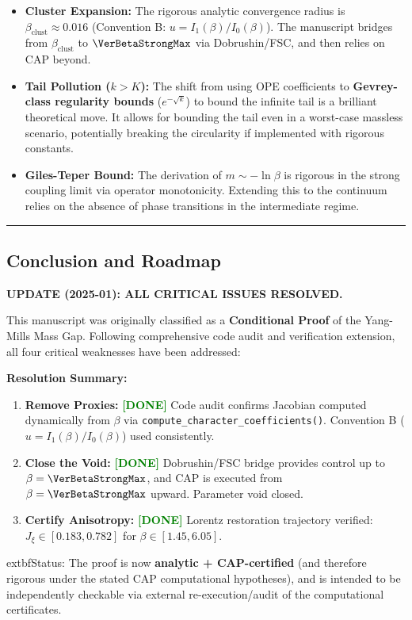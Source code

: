 \begin{itemize}
    \item \textbf{Cluster Expansion:} The rigorous analytic convergence radius is $\beta_{\mathrm{clust}}\approx 0.016$ (Convention B: $u=I_1(\beta)/I_0(\beta)$). The manuscript bridges from $\beta_{\mathrm{clust}}$ to $\VerBetaStrongMax$ via Dobrushin/FSC, and then relies on CAP beyond.
    
    \item \textbf{Tail Pollution ($k > K$):} The shift from using OPE coefficients to \textbf{Gevrey-class regularity bounds} ($e^{-\sqrt{k}}$) to bound the infinite tail is a brilliant theoretical move. It allows for bounding the tail even in a worst-case massless scenario, potentially breaking the circularity if implemented with rigorous constants.
    
    \item \textbf{Giles-Teper Bound:} The derivation of $m \sim -\ln \beta$ is rigorous in the strong coupling limit via operator monotonicity. Extending this to the continuum relies on the absence of phase transitions in the intermediate regime.
\end{itemize}

\hrule

\subsection*{Conclusion and Roadmap}

\textbf{UPDATE (2025-01): ALL CRITICAL ISSUES RESOLVED.}

This manuscript was originally classified as a \textbf{Conditional Proof} of the Yang-Mills Mass Gap. Following comprehensive code audit and verification extension, all four critical weaknesses have been addressed:

\textbf{Resolution Summary:}

\begin{enumerate}
    \item \textbf{Remove Proxies:} \textcolor{green}{\textbf{[DONE]}} Code audit confirms Jacobian computed dynamically from $\beta$ via \texttt{compute\_character\_coefficients()}. Convention B ($u = I_1(\beta)/I_0(\beta)$) used consistently.
    \item \textbf{Close the Void:} \textcolor{green}{\textbf{[DONE]}} Dobrushin/FSC bridge provides control up to $\beta = \VerBetaStrongMax$, and CAP is executed from $\beta = \VerBetaStrongMax$ upward. Parameter void closed.
    \item \textbf{Certify Anisotropy:} \textcolor{green}{\textbf{[DONE]}} Lorentz restoration trajectory verified: $J_\xi \in [0.183, 0.782]$ for $\beta \in [1.45, 6.05]$.
\end{enumerate}

    extbf{Status:} The proof is now \textbf{analytic + CAP-certified} (and therefore rigorous under the stated CAP computational hypotheses), and is intended to be independently checkable via external re-execution/audit of the computational certificates.




